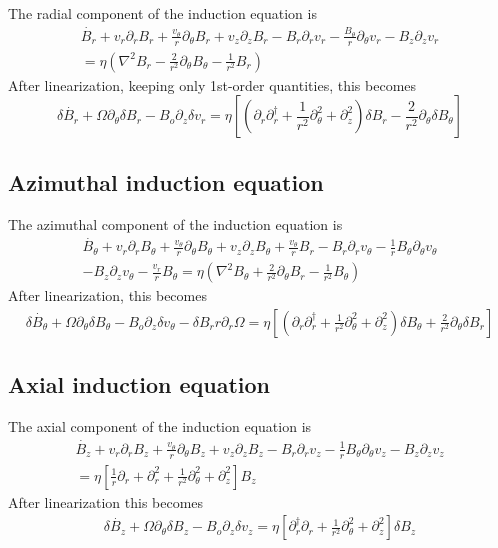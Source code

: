 \documentclass[letterpaper]{article}
\begin{document}
The radial component of the induction equation is
\begin{align}
\dot{B_r} + v_r \partial_r B_r + \frac{v_\theta}{r}\partial_\theta B_r + v_z \partial_z B_r - B_r \partial_r v_r -\frac{B_\theta}{r}\partial_\theta v_r - B_z \partial_z v_r
\\ \nonumber
 = \eta\left(\nabla^2 B_r -\frac{2}{r^2}\partial_\theta B_\theta - \frac{1}{r^2}B_r\right)
\end{align}
After linearization, keeping only 1st-order quantities, this becomes
\begin{equation}
\delta \dot{B_r} + \Omega \partial_\theta \delta B_r - B_o \partial_z \delta v_r = \eta\left[\left(\partial_r \partial_r^\dagger + \frac{1}{r^2}\partial_\theta^2 + \partial_z^2\right)\delta B_r - \frac{2}{r^2}\partial_\theta \delta B_\theta\right]
\end{equation}

\subsection{Azimuthal induction equation}
The azimuthal component of the induction equation is
\begin{align}
\dot{B_\theta}+v_r \partial_r B_\theta + \frac{v_\theta}{r}\partial_\theta B_\theta + v_z \partial_z B_\theta + \frac{v_\theta}{r}B_r - B_r\partial_r v_\theta - \frac{1}{r}B_\theta \partial_\theta v_\theta
\\ \nonumber
 - B_z \partial_z v_\theta - \frac{v_r}{r}B_\theta = \eta\left(\nabla^2 B_\theta + \frac{2}{r^2}\partial_\theta B_r - \frac{1}{r^2}B_\theta \right)
\end{align}
After linearization, this becomes
\begin{align}
\delta \dot{B_\theta} + \Omega \partial_\theta \delta B_\theta - B_o \partial_z \delta v_\theta - \delta B_r r \partial_r \Omega=\eta\left[\left(\partial_r \partial_r^\dagger + \frac{1}{r^2}\partial_\theta^2 + \partial_z^2\right)\delta B_\theta + \frac{2}{r^2}\partial_\theta \delta B_r\right]
\end{align}

\subsection{Axial induction equation}
The axial component of the induction equation is
\begin{align}
\dot{B_z} + v_r \partial_r B_z + \frac{v_\theta}{r}\partial_\theta B_z + v_z \partial_z B_z - B_r \partial_r v_z - \frac{1}{r}B_\theta \partial_\theta v_z - B_z \partial_z v_z
\\ \nonumber
=\eta\left[\frac{1}{r}\partial_r + \partial_r^2 + \frac{1}{r^2}\partial_\theta^2 + \partial_z^2\right]B_z
\end{align}
After linearization this becomes
\begin{align}
\delta\dot{B_z} + \Omega\partial_\theta \delta B_z - B_o\partial_z \delta v_z = \eta\left[\partial_r^\dagger \partial_r + \frac{1}{r^2}\partial_\theta^2 + \partial_z^2\right]\delta B_z
\end{align}
\end{document}
